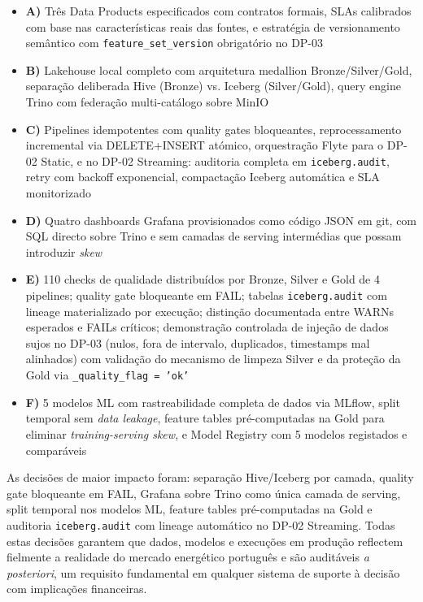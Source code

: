 \documentclass[11pt,a4paper]{article}
\begin{document}
\begin{itemize}[leftmargin=*]
  \item \textbf{A)} Três Data Products especificados com contratos formais, SLAs calibrados com base nas características reais das fontes, e estratégia de versionamento semântico com \texttt{feature\_set\_version} obrigatório no DP-03
  \item \textbf{B)} Lakehouse local completo com arquitetura medallion Bronze/Silver/Gold, separação deliberada Hive (Bronze) vs. Iceberg (Silver/Gold), query engine Trino com federação multi-catálogo sobre MinIO
  \item \textbf{C)} Pipelines idempotentes com quality gates bloqueantes, reprocessamento incremental via DELETE+INSERT atómico, orquestração Flyte para o DP-02 Static, e no DP-02 Streaming: auditoria completa em \texttt{iceberg.audit}, retry com backoff exponencial, compactação Iceberg automática e SLA monitorizado
  \item \textbf{D)} Quatro dashboards Grafana provisionados como código JSON em git, com SQL directo sobre Trino e sem camadas de serving intermédias que possam introduzir \textit{skew}
  \item \textbf{E)} 110 checks de qualidade distribuídos por Bronze, Silver e Gold de 4 pipelines; quality gate bloqueante em FAIL; tabelas \texttt{iceberg.audit} com lineage materializado por execução; distinção documentada entre WARNs esperados e FAILs críticos; demonstração controlada de injeção de dados sujos no DP-03 (nulos, fora de intervalo, duplicados, timestamps mal alinhados) com validação do mecanismo de limpeza Silver e da proteção da Gold via \texttt{\_quality\_flag = 'ok'}
  \item \textbf{F)} 5 modelos ML com rastreabilidade completa de dados via MLflow, split temporal sem \textit{data leakage}, feature tables pré-computadas na Gold para eliminar \textit{training-serving skew}, e Model Registry com 5 modelos registados e comparáveis
\end{itemize}

As decisões de maior impacto foram: separação Hive/Iceberg por camada, quality gate bloqueante em FAIL, Grafana sobre Trino como única camada de serving, split temporal nos modelos ML, feature tables pré-computadas na Gold e auditoria \texttt{iceberg.audit} com lineage automático no DP-02 Streaming. Todas estas decisões garantem que dados, modelos e execuções em produção reflectem fielmente a realidade do mercado energético português e são auditáveis \textit{a posteriori}, um requisito fundamental em qualquer sistema de suporte à decisão com implicações financeiras.

\end{document}
